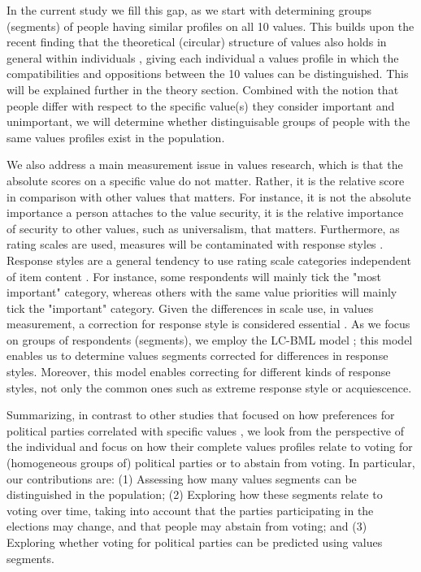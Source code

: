 \documentclass[12pt,letter]{article}\usepackage[]{graphicx}\usepackage[]{xcolor}
\begin{document}
In the current study we fill this gap, as we start with determining groups (segments) of people having similar profiles on all 10 values. This builds upon the recent finding that the theoretical (circular) structure of values also holds in general within individuals \citep{gollan2014,borg2015}, giving each individual a values profile in which the compatibilities and oppositions between the 10 values can be distinguished. This will be explained further in the theory section. Combined with the notion that people differ with respect to the specific value(s) they consider important and unimportant, we will determine whether distinguisable groups of people with the same values profiles exist in the population.

We also address a main measurement issue in values research, which is that the absolute scores on a specific value do not matter. Rather, it is the relative score in comparison with other values that matters. For instance, it is not the absolute importance a person attaches to the value security, it is the relative importance of security to other values, such as universalism, that matters. Furthermore, as rating scales are used, measures will be contaminated with response styles \citep[e.g.][]{vaerenbergh2013,baumgartner2001}. Response styles are a general tendency to use rating scale categories independent of item content \citep{paulhus1991}. For instance, some respondents will mainly tick the "most important" category, whereas others with the same value priorities will mainly tick the "important" category. Given the differences in scale use, in values measurement, a correction for response style is considered essential \citep{schwartz2007}. As we focus on groups of respondents (segments), we employ the LC-BML model \citep{vanrosmalen2010}; this model enables us to determine values segments corrected for differences in response styles. Moreover, this model enables correcting for different kinds of response styles, not only the common ones such as extreme response style or acquiescence.

Summarizing, in contrast to other studies that focused on how preferences for political parties correlated with specific values \citep{caprara2006, thorisdottir2007, caprara2012}, we look from the perspective of the individual and focus on how their complete values profiles relate to voting for (homogeneous groups of) political parties or to abstain from voting. In particular, our contributions are: 
(1) Assessing how many values segments can be distinguished in the population;
(2) Exploring how these segments relate to voting over time, taking into account that the parties participating in the elections may change, and that people may abstain from voting; and
(3) Exploring whether voting for political parties can be predicted using values segments.
\end{document}
